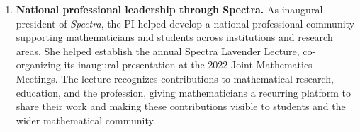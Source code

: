 \documentclass[12pt,letterpaper]{article}
\begin{document}
\begin{enumerate}[label=\textbf{\arabic*.},leftmargin=0.22in,
                  labelsep=0.07in,itemsep=9pt,topsep=0pt,parsep=0pt]
\item \textbf{National professional leadership through Spectra.}
As inaugural president of \textit{Spectra}, the PI helped develop a national professional community supporting mathematicians and students across institutions and research areas. She helped establish the annual Spectra Lavender Lecture, co-organizing its inaugural presentation at the 2022 Joint Mathematics Meetings. The lecture recognizes contributions to mathematical research, education, and the profession, giving mathematicians a recurring platform to share their work and making these contributions visible to students and the wider mathematical community.

\end{enumerate}
\end{document}
